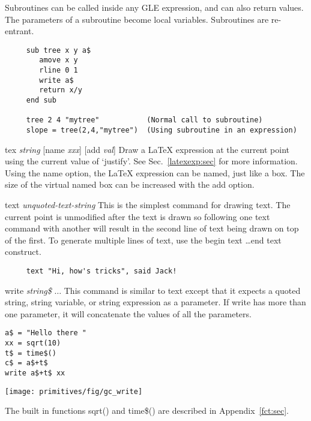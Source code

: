 \begin{commanddescription}
Subroutines can be called inside any GLE expression, and can
also return values.  The parameters of a subroutine become local variables.
Subroutines are re-entrant.

\begin{Verbatim}
     sub tree x y a$
        amove x y
        rline 0 1
        write a$
        return x/y
     end sub

     tree 2 4 "mytree"           (Normal call to subroutine)
     slope = tree(2,4,"mytree")  (Using subroutine in an expression)
\end{Verbatim}

\item[{\sf tex {\it string} [name {\it xxx}] [add {\it val}]}]
Draw a \LaTeX{} expression at the current point using the current value of `justify'. See Sec.~\ref{latexexp:sec} for more information. Using the {\sf name} option, the \LaTeX{} expression can be named, just like a box. The size of the virtual named box can be increased with the {\sf add} option.

\item[{\sf text {\it unquoted-text-string}}]
  This is the simplest command for drawing text.  The current point
is unmodified after the text is drawn so following one text command
with another will result in the second line of text being drawn on
top of the first.
To generate multiple lines of text, use the {\sf begin text} \ldots {\sf  end
text} construct.

\preglecode{}
\begin{Verbatim}
     text "Hi, how's tricks", said Jack!
\end{Verbatim}
\postglecode{}

\item[{\sf write {\it string\$} $\ldots$}]
 This command is similar to {\sf text} except that it expects a quoted string,
string variable, or string expression as a parameter. If write has more than one parameter, it will concatenate the values of all the parameters.

\begin{minipage}[c]{8cm}
\begin{Verbatim}
a$ = "Hello there "
xx = sqrt(10)
t$ = time$()
c$ = a$+t$ 
write a$+t$ xx
\end{Verbatim}
\end{minipage}
\hfill
\begin{minipage}[c]{7cm}
\mbox{\texttt{[image: primitives/fig/gc\_write]}}
\end{minipage}

The built in functions {\sf sqrt()} and {\sf time\$()} are described in
Appendix~\ref{fct:sec}.

\end{commanddescription}

